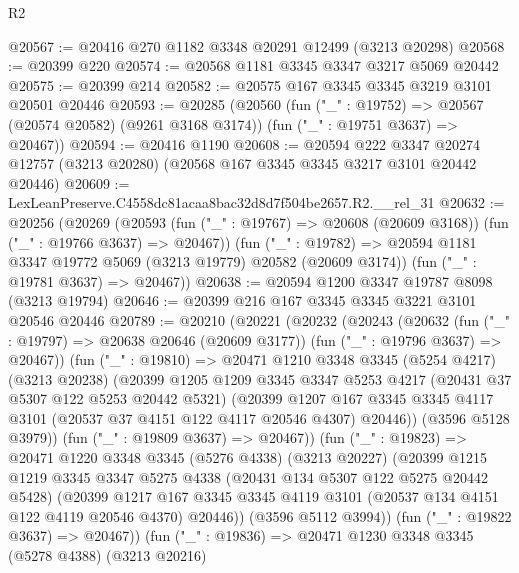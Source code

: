 \begin{lexlean}{R2}
\begin{coremodule}
@20567 := @20416 @270 @1182 @3348 @20291 @12499 (@3213 @20298)
@20568 := @20399 @220
@20574 := @20568 @1181 @3345 @3347 @3217 @5069 @20442
@20575 := @20399 @214
@20582 := @20575 @167 @3345 @3345 @3219 @3101 @20501 @20446
@20593 := @20285
    (@20560
      (fun ("_" : @19752) => @20567 (@20574 @20582) (@9261 @3168 @3174))
      (fun ("_" : @19751 @3637) => @20467))
@20594 := @20416 @1190
@20608 := @20594
    @222
    @3347
    @20274
    @12757
    (@3213 @20280)
    (@20568 @167 @3345 @3345 @3217 @3101 @20442 @20446)
@20609 := LexLeanPreserve.C4558dc81acaa8bac32d8d7f504be2657.R2.__rel_31
@20632 := @20256
    (@20269
      (@20593 (fun ("_" : @19767) => @20608 (@20609 @3168)) (fun ("_" : @19766 @3637) => @20467))
      (fun ("_" : @19782) => @20594 @1181 @3347 @19772 @5069 (@3213 @19779) @20582 (@20609 @3174))
      (fun ("_" : @19781 @3637) => @20467))
@20638 := @20594 @1200 @3347 @19787 @8098 (@3213 @19794)
@20646 := @20399 @216 @167 @3345 @3345 @3221 @3101 @20546 @20446
@20789 := @20210
    (@20221
      (@20232
        (@20243
          (@20632
            (fun ("_" : @19797) => @20638 @20646 (@20609 @3177))
            (fun ("_" : @19796 @3637) => @20467))
          (fun ("_" : @19810) =>
          @20471
            @1210
            @3348
            @3345
            (@5254 @4217)
            (@3213 @20238)
            (@20399
              @1205
              @1209
              @3345
              @3347
              @5253
              @4217
              (@20431 @37 @5307 @122 @5253 @20442 @5321)
              (@20399
                @1207
                @167
                @3345
                @3345
                @4117
                @3101
                (@20537 @37 @4151 @122 @4117 @20546 @4307)
                @20446))
            (@3596 @5128 @3979))
          (fun ("_" : @19809 @3637) => @20467))
        (fun ("_" : @19823) =>
        @20471
          @1220
          @3348
          @3345
          (@5276 @4338)
          (@3213 @20227)
          (@20399
            @1215
            @1219
            @3345
            @3347
            @5275
            @4338
            (@20431 @134 @5307 @122 @5275 @20442 @5428)
            (@20399
              @1217
              @167
              @3345
              @3345
              @4119
              @3101
              (@20537 @134 @4151 @122 @4119 @20546 @4370)
              @20446))
          (@3596 @5112 @3994))
        (fun ("_" : @19822 @3637) => @20467))
      (fun ("_" : @19836) =>
      @20471
        @1230
        @3348
        @3345
        (@5278 @4388)
        (@3213 @20216)

\end{coremodule}
\end{lexlean}

